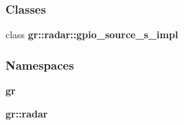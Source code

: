 \subsubsection*{Classes}
\begin{DoxyCompactItemize}
\item 
class {\bf gr\+::radar\+::gpio\+\_\+source\+\_\+s\+\_\+impl}
\end{DoxyCompactItemize}
\subsubsection*{Namespaces}
\begin{DoxyCompactItemize}
\item 
 {\bf gr}
\item 
 {\bf gr\+::radar}
\end{DoxyCompactItemize}

